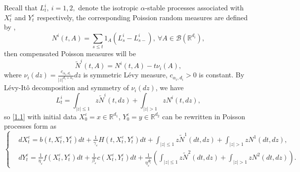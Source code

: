 \documentclass[11pt,reqno]{amsart}
\numberwithin{equation}{section}
\begin{document}
Recall that $ L_{t}^{i},\ i=1,2,$ denote the isotropic $\alpha$-stable processes associated with $X_{t}^{\varepsilon}$ and $Y_{t}^{\varepsilon}$ respectively, the corresponding Poission random measures are defined by \cite{DA},
$$ N^{i}(t,A)=\sum_{s\leq t}1_{A}(L_{s}^{i}-L_{s-}^{i}),\ \forall A\in \mathcal{B}(\mathbb{R}^{d_{i} }),$$
then compensated Poisson measures will be 
$$ \tilde{N}^{i}(t,A)=N^{i}(t,A)-t\nu_{i}(A),$$
where $\nu_{i}(dz)=\frac{c_{\alpha_{i},d_{i}}}{|z|^{d_{i}+\alpha_{i}}}dz$ is symmetric L\'{e}vy measure, $c_{\alpha_{i},d_{i}}>0$ is constant. By L\'{e}vy-It\^{o} decomposition and symmetry of $\nu_{i}(dz)$, we have
\begin{equation}\label{3.1}
	 L^{i}_{t}=\int_{|z|\leq1}z \tilde{N}^{i}(t,dz)+\int_{|z|>1}zN^{i}(t,dz),
\end{equation}	 
so \eqref{1.1} with initial data  $X^{\varepsilon}_{0}=x\in \mathbb{R}^{d_{1} }$, $ Y^{\varepsilon}_{0}=y\in \mathbb{R}^{d_{2} }$ can be rewritten in Poisson processes form as 
\begin{equation}\label{3.2}
	\left\{
\begin{aligned}
	&dX_{t}^{\varepsilon}=b(t,X_{t}^{\varepsilon},Y_{t}^{\varepsilon})dt+\frac{1}{\gamma_{\varepsilon}}H(t,X_{t}^{\varepsilon},Y_{t}^{\varepsilon})dt+\int_{|z|\leq1}z \tilde{N}^{1}(dt,dz)+\int_{|z|>1}zN^{1}(dt,dz),\\
	&dY_{t}^{\varepsilon}=\frac{1}{\eta_{\varepsilon}}f(X_{t}^{\varepsilon},Y_{t}^{\varepsilon})dt+\frac{1}{\beta_{\varepsilon}}c(X_{t}^{\varepsilon},Y_{t}^{\varepsilon})dt+\frac{1}{\eta_{\varepsilon}^{\frac{1}{\alpha_{2}}}}\left( \int_{|z|\leq1}z \tilde{N}^{2}(dt,dz)+\int_{|z|>1}zN^{2}(dt,dz)\right).
\end{aligned}
\right.
\end{equation}
\end{document}
